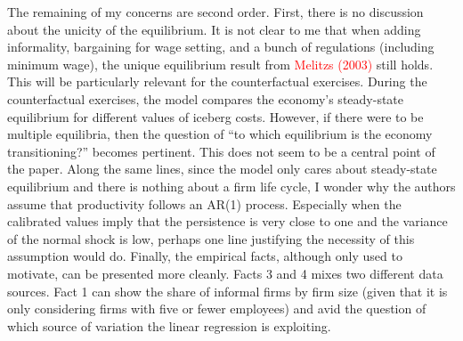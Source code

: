\documentclass[12pt,oneside,reqno]{amsart}
\begin{document}
The remaining of my concerns are second order. First, there is no discussion about the unicity of the equilibrium. It is not clear to me that when adding informality, bargaining for wage setting, and a bunch of regulations (including minimum wage), the unique equilibrium result from \textcolor{red}{Melitzs (2003)} still holds. This will be particularly relevant for the counterfactual exercises. During the counterfactual exercises, the model compares the economy's steady-state equilibrium for different values of iceberg costs. However, if there were to be multiple equilibria, then the question of ``to which equilibrium is the economy transitioning?'' becomes pertinent. This does not seem to be a central point of the paper. Along the same lines, since the model only cares about steady-state equilibrium and there is nothing about a firm life cycle, I wonder why the authors assume that productivity follows an AR(1) process. Especially when the calibrated values imply that the persistence is very close to one and the variance of the normal shock is low, perhaps one line justifying the necessity of this assumption would do. Finally, the empirical facts, although only used to motivate, can be presented more cleanly. Facts 3 and 4 mixes two different data sources. Fact 1 can show the share of informal firms by firm size (given that it is only considering firms with five or fewer employees) and avid the question of which source of variation the linear regression is exploiting. 
\end{document}
